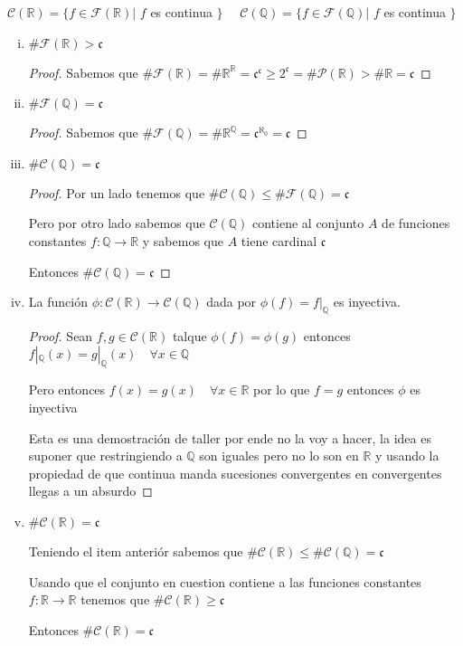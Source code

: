 \documentclass[12pt]{article}
\newcommand{\n}{\aleph_{0}}
\newcommand{\Q}{\mathbb{Q}}
\newcommand{\R}{\mathbb{R}}
\newcommand{\ra}{\rightarrow}
\theoremstyle{definition}
\begin{document}
\begin{center} $ \mathcal{C}(\R) = \{f \in \mathcal{F}(\R) | $ $f $ es continua $\} \quad$ $\mathcal{C}(\Q) = \{f \in \mathcal{F}(\Q) |$ $ f $ es continua $\} $ \end{center}
  \begin{enumerate}[i.]
    \item $\#\mathcal{F}(\R) > \mathfrak{c}$
      \begin{proof}
	Sabemos que $\# \mathcal{F}(\R) = \# \R^{\R} =  \mathfrak{c}^{\mathfrak{c}} \geq 2^{\mathfrak{c}} = \# \mathcal{P}(\R) > \# \R =  \mathfrak{c}$
      \end{proof}
    \item $\# \mathcal{F}(\Q) = \mathfrak{c}$
      \begin{proof}
	Sabemos que $\# \mathcal{F}(\Q) = \# \R^{\Q} = \mathfrak{c}^{\n} = \mathfrak{c}$	

	      \end{proof}
      \newpage
    \item $\# \mathcal{C}(\Q) = \mathfrak{c}$
      \begin{proof}
	Por un lado tenemos que $\# \mathcal{C}(\Q)  \leq \# \mathcal{F}(\Q) = \mathfrak{c}$ 

Pero por otro lado sabemos que $\mathcal{C}(\Q)$ contiene al conjunto $A$ de funciones constantes $f: \Q \ra \R$ y sabemos que $A$ tiene cardinal $\mathfrak{c}$

	Entonces $\# \mathcal{C}(\Q) = \mathfrak{c}$
      \end{proof}
    \item La función $\phi : \mathcal{C}(\R) \ra \mathcal{C}(\Q)$ dada por $\phi(f) = f|_{\Q}$ es inyectiva.
      \begin{proof}
      Sean $f,g \in \mathcal{C}(\R) $ talque $\phi (f) = \phi(g)$ entonces $f|_{\Q}(x) = g|_{\Q}(x) \quad \forall x \in \Q$

      Pero entonces $f(x) = g(x) \quad \forall x \in \R$ por lo que $f = g $ entonces $\phi$ es inyectiva

      Esta es una demostración de taller por ende no la voy a hacer, la idea es suponer que restringiendo a $\Q$ son iguales pero no lo son en $\R$ y usando la propiedad de que continua manda sucesiones convergentes en convergentes llegas a un absurdo 
      \end{proof}
    \item $\# \mathcal{C}(\R) = \mathfrak{c}$

      Teniendo el item anteriór sabemos que $\# \mathcal{C}(\R) \leq \# \mathcal{C}(\Q) = \mathfrak{c}$

      Usando que el conjunto en cuestion contiene a las funciones constantes $f : \R \ra \R $ tenemos que $\# \mathcal{C}(\R) \geq \mathfrak{c}$

      Entonces $\# \mathcal{C}(\R) = \mathfrak{c}$
  \end{enumerate}
\end{document}
